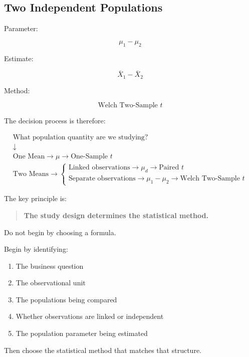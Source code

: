 \documentclass[
  letterpaper,
  DIV=11,
  numbers=noendperiod]{scrreprt}
\providecommand{\tightlist}{%
  \setlength{\itemsep}{0pt}\setlength{\parskip}{0pt}}
\begin{document}
\subsection{Two Independent
Populations}\label{two-independent-populations}

Parameter:

\[
\mu_1-\mu_2
\]

Estimate:

\[
\bar{X}_1-\bar{X}_2
\]

Method:

\[
\text{Welch Two-Sample }t
\]

The decision process is therefore:

\[
\boxed{
\begin{array}{c}
\text{What population quantity are we studying?}\\[6pt]
\downarrow\\
\text{One Mean}
\rightarrow
\mu
\rightarrow
\text{One-Sample }t\\[8pt]
\text{Two Means}
\rightarrow
\begin{cases}
\text{Linked observations}
\rightarrow
\mu_d
\rightarrow
\text{Paired }t\\[6pt]
\text{Separate observations}
\rightarrow
\mu_1-\mu_2
\rightarrow
\text{Welch Two-Sample }t
\end{cases}
\end{array}
}
\]

The key principle is:

\begin{quote}
\textbf{The study design determines the statistical method.}
\end{quote}

Do not begin by choosing a formula.

Begin by identifying:

\begin{enumerate}
\def\labelenumi{\arabic{enumi}.}
\tightlist
\item
  The business question
\item
  The observational unit
\item
  The populations being compared
\item
  Whether observations are linked or independent
\item
  The population parameter being estimated
\end{enumerate}

Then choose the statistical method that matches that structure.

\end{document}
